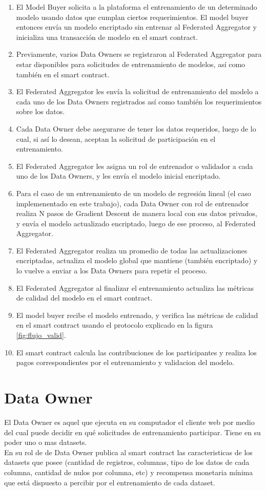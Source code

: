 \documentclass[
11pt, %
oneside, %
spanish, %
singlespacing, %
parskip, %
headsepline, %
chapterinoneline, %
]{MastersDoctoralThesis} %
\begin{document}
\begin{enumerate}
\item El Model Buyer solicita a la plataforma el entrenamiento de un determinado modelo usando datos que cumplan ciertos requerimientos. El model buyer entonces envía un modelo encriptado sin entrenar al Federated Aggregator y inicializa una transacción de modelo en el smart contract.
\item Previamente, varios Data Owners se registraron al Federated Aggregator para estar disponibles para solicitudes de entrenamiento de modelos, así como también en el smart contract.
\item El Federated Aggregator les envía la solicitud de entrenamiento del modelo a cada uno de los Data Owners registrados así como también los requerimientos sobre los datos.
\item Cada Data Owner debe asegurarse de tener los datos requeridos, luego de lo cual, si así lo desean, aceptan la solicitud de participación en el entrenamiento.
\item El Federated Aggregator les asigna un rol de entrenador o validador a cada uno de los Data Owners, y les envía el modelo inicial encriptado.
\item Para el caso de un entrenamiento de un modelo de regresión lineal (el caso implemenentado en este trabajo), cada Data Owner con rol de entrenador realiza N pasos de Gradient Descent de manera local con sus datos privados, y envía el modelo actualizado encriptado, luego de ese proceso, al Federated Aggregator.
\item El Federated Aggregator realiza un promedio de todas las actualizaciones encriptadas, actualiza el modelo global que mantiene (también encriptado) y lo vuelve a enviar a los Data Owners para repetir el proceso.
\item El Federated Aggregator al finalizar el entrenamiento actualiza las métricas de calidad del modelo en el smart contract.
\item El model buyer recibe el modelo entrenado, y verifica las métricas de calidad en el smart contract usando el protocolo explicado en la figura \ref{fig:flujo_valid}.
\item El smart contract calcula las contribuciones de los participantes y realiza los pagos correspondientes por el entrenamiento y validacion del modelo.
\end{enumerate}


\section{Data Owner}
\justify
El Data Owner es aquel que ejecuta en su computador el cliente web por medio del cual puede decidir en qué solicitudes de entrenamiento participar. Tiene en su poder uno o mas datasets. \\
En su rol de de Data Owner publica al smart contract las caracteristicas de los datasets que posee (cantidad de registros, columnas, tipo de los datos de cada columna, cantidad de nulos por columna, etc) y recompensa monetaria mínima que está dispuesto a percibir por el entrenamiento de cada dataset.
\end{document}
